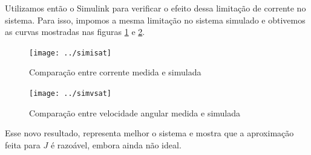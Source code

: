 \documentclass{article}
\begin{document}
Utilizamos então o Simulink para verificar o efeito dessa limitação de corrente no sistema. Para isso, impomos a mesma limitação no sistema simulado e obtivemos as curvas mostradas nas figuras \ref{fig:simisat} e \ref{fig:simvsat}.

\begin{figure}[H]
	\centering
	\texttt{[image: ../simisat]}
	\caption{Comparação entre corrente medida e simulada}
	\label{fig:simisat}
\end{figure}
\begin{figure}[H]
	\centering
	\texttt{[image: ../simvsat]}
	\caption{Comparação entre velocidade angular medida e simulada}
	\label{fig:simvsat}
\end{figure}

Esse novo resultado, representa melhor o sistema e mostra que a aproximação feita para $J$ é razoável, embora ainda não ideal.

\begin{thebibliography}{widestlabel}
\end{thebibliography}
\end{document}
